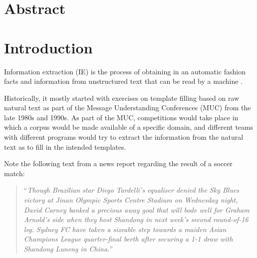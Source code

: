 \documentclass[11pt,a4paper,openright]{memoir}
\title{\theTitle}
\author{\theAuthor}
\begin{document}
\setlength\parindent{24pt}
\captionnamefont{\bfseries}

\frontmatter

\makeunswfrontmatter

\newpage
\thispagestyle{empty}
\strut
\vfill


\chapter*{Abstract}

\clearpage
\tableofcontents

\cleardoublepage

\mainmatter


%
%
%
%


\chapter{Introduction}
Information extraction (IE) is the process of obtaining in an automatic fashion facts and information from unstructured text that can be read by a machine \cite{Jurafsky:2000:SLP:555733}.

Historically, it mostly started with exercises on template filling based on raw natural text \cite{Moens:2006:IEA:1177314} as part of the Message Understanding Conferences (MUC) from the late 1980s and 1990s. As part of the MUC, competitions would take place in which a corpus would be made available of a specific domain, and different teams with different programs would try to extract the information from the natural text as to fill in the intended templates.

Note the following text from a news report regarding the result of a soccer match:

\blockquote{\enquote{\emph{Though Brazilian star Diego Tardelli's equaliser denied the Sky Blues victory at Jinan Olympic Sports Centre Stadium on Wednesday night, David Carney banked a precious away goal that will bode well for Graham Arnold's side when they host Shandong in next week's second round-of-16 leg. Sydney FC have taken a sizeable step towards a maiden Asian Champions League quarter-final berth after securing a 1-1 draw with Shandong Luneng in China.}}}
\end{document}
